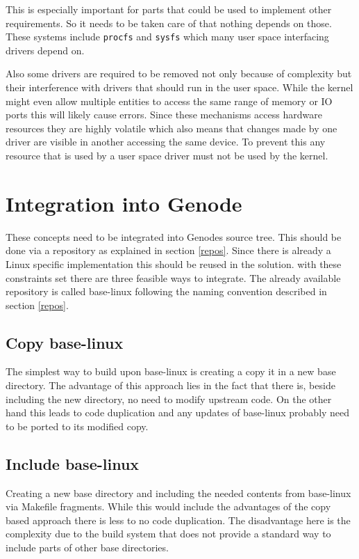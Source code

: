 \documentclass[
a4paper,
12pt,
notitlepage,
parskip=half,
DIV=11,
]{scrbook}
\begin{document}
		This is especially important for parts that could be used to implement other requirements.
		So it needs to be taken care of that nothing depends on those.
		These systems include \texttt{procfs} and \texttt{sysfs} which many user space interfacing drivers depend on. \citep{sysfs} \citep{procfs}
		
		Also some drivers are required to be removed not only because of complexity but their interference with drivers that should run in the user space.
		While the kernel might even allow multiple entities to access the same range of memory or IO ports this will likely cause errors.
		Since these mechanisms access hardware resources they are highly volatile which also means that changes made by one driver are visible in another accessing the same device.
		To prevent this any resource that is used by a user space driver must not be used by the kernel.
		
		\section{Integration into Genode}
		
		These concepts need to be integrated into Genodes source tree.
		This should be done via a repository as explained in section \ref{repos}.
		Since there is already a Linux specific implementation this should be reused in the solution.
		with these constraints set there are three feasible ways to integrate.
		The already available repository is called base-linux following the naming convention described in section \ref{repos}.
		
		\subsection{Copy base-linux}
		The simplest way to build upon base-linux is creating a copy it in a new base directory.
		The advantage of this approach lies in the fact that there is, beside including the new directory, no need to modify upstream code.
		On the other hand this leads to code duplication and any updates of base-linux probably need to be ported to its modified copy.
		
		\subsection{Include base-linux}
		Creating a new base directory and including the needed contents from base-linux via Makefile fragments.
		While this would include the advantages of the copy based approach there is less to no code duplication.
		The disadvantage here is the complexity due to the build system that does not provide a standard way to include parts of other base directories.
		
\end{document}
